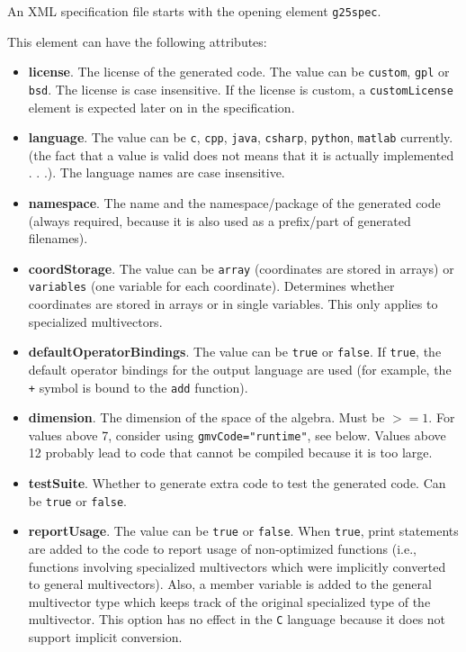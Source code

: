\documentclass[10pt, a4paper]{article}
\begin{document}
An XML specification file starts with the opening element {\tt g25spec}.

This element can have the following attributes:
\begin{itemize}
\item {\bf license}. The license of the generated code. The value can be {\tt custom}, {\tt gpl} or {\tt bsd}. The license is case insensitive.
If the license is custom, a {\tt customLicense} element is expected later on in the specification.

\item {\bf language}. The value can be {\tt c}, {\tt cpp}, {\tt java}, {\tt csharp}, {\tt python}, {\tt matlab} currently. 
(the fact that a value is valid does not means that it is actually implemented . . .). The language names are case insensitive.

\item {\bf namespace}. The name and the namespace/package of the generated code (always required, because it is also used as a prefix/part of generated filenames).

\item {\bf coordStorage}. The value can be {\tt array} (coordinates are stored in arrays) or {\tt variables} (one variable for each coordinate). 
Determines whether coordinates are stored in arrays or in single variables. This only applies to specialized multivectors. 

\item {\bf defaultOperatorBindings}. The value can be {\tt true} or {\tt false}. If {\tt true}, the default operator bindings for the output language are used 
(for example, the {\tt +} symbol is bound to the {\tt add} function).

\item {\bf dimension}. The dimension of the space of the algebra. Must be $>= 1$. 
For values above 7, consider using {\tt gmvCode="runtime"}, see below.
Values above 12 probably lead to code that cannot be compiled because it is too large.

\item {\bf testSuite}. Whether to generate extra code to test the generated code. 
	Can be {\tt true} or {\tt false}.


\item {\bf reportUsage}. The value can be {\tt true} or {\tt false}. 
       When {\tt true}, print statements are added to the code to report usage of non-optimized functions
       (i.e., functions involving specialized multivectors which were implicitly converted to general multivectors). 
       Also, a member variable is added to the general multivector type which keeps track of the original specialized 
       type of the multivector. This option has no effect in the {\tt C} language because it does not support implicit conversion.
 

\end{itemize}
\end{document}
